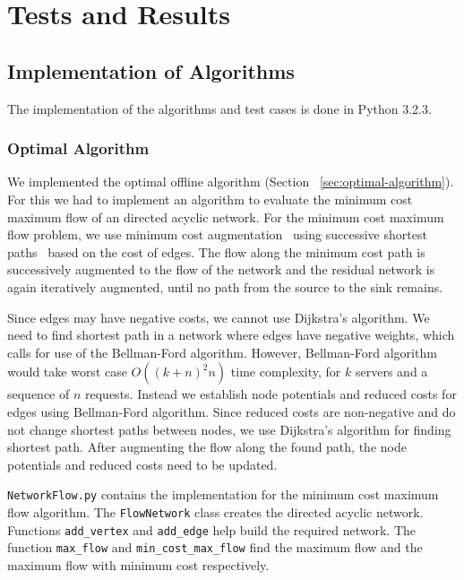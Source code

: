 \chapter{Tests and Results}\label{ch:tests-results}

\section{Implementation of Algorithms}\label{sec:algorithm-implementation}

The implementation of the algorithms and test cases is done in Python 3.2.3.

\subsection{Optimal Algorithm}

We implemented the optimal offline algorithm (Section ~\ref{sec:optimal-algorithm}). For this we had to implement an algorithm to evaluate the  minimum cost maximum flow of an directed acyclic network. For the minimum cost maximum flow problem, we use minimum cost augmentation~\cite{Tar-b} using successive shortest paths~\cite{AMO-b} based on the cost of edges. The flow along the minimum cost path is successively augmented to the flow of the network and the residual network is again iteratively augmented, until no path from the source to the sink remains.

Since edges may have negative costs, we cannot use Dijkstra's algorithm. We need to find shortest path in a network where edges have negative weights, which calls for use of the Bellman-Ford algorithm. However, Bellman-Ford algorithm would take worst case $O((k+n)^2n)$ time complexity, for $k$ servers and a sequence of $n$ requests. Instead we establish node potentials and reduced  costs for edges using Bellman-Ford algorithm. Since reduced costs are non-negative and do not change shortest paths between nodes, we use Dijkstra's algorithm for finding shortest path. After augmenting the flow along the found path, the node potentials and reduced costs need to be updated.

\texttt{NetworkFlow.py} contains the implementation for the minimum cost maximum flow algorithm. The \texttt{FlowNetwork} class creates the directed acyclic network. Functions \texttt{add\_vertex} and \texttt{add\_edge} help build the required network. The function \texttt{max\_flow} and \texttt{min\_cost\_max\_flow} find the maximum flow and the maximum flow with minimum cost respectively. \\

